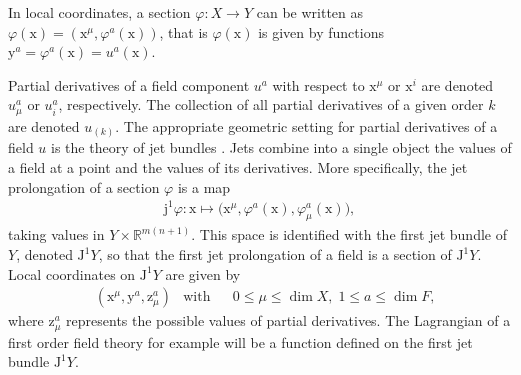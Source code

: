 \documentclass[12pt,a4paper,reqno]{article}
\begin{document}
In local coordinates, a section ${\ensuremath{\varphi}} : X \rightarrow Y$ can be written as ${\ensuremath{\varphi}} ({\ensuremath{{\ensuremath{\mathrm{{x}}}}}}) = ({\ensuremath{{\ensuremath{\mathrm{{x}}}}}}^{\mu}, {\ensuremath{\varphi}}^{a} ({\ensuremath{{\ensuremath{\mathrm{{x}}}}}}) )$, that is ${\ensuremath{\varphi}} ({\ensuremath{{\ensuremath{\mathrm{{x}}}}}})$ is given by functions ${\ensuremath{{\ensuremath{\mathrm{{y}}}}}}^{a} = {\ensuremath{\varphi}}^{a} ({\ensuremath{{\ensuremath{\mathrm{{x}}}}}}) = {\ensuremath{{\ensuremath{{u}}}}}^{a} ({\ensuremath{{\ensuremath{\mathrm{{x}}}}}})$.

Partial derivatives of a field component ${\ensuremath{{\ensuremath{{u}}}}}^{a}$ with respect to ${\ensuremath{{\ensuremath{\mathrm{{x}}}}}}^{\mu}$ or ${\ensuremath{{\ensuremath{\mathrm{{x}}}}}}^{i}$ are denoted ${\ensuremath{{\ensuremath{{u}}}}}^{a}_{\mu}$ or ${\ensuremath{{\ensuremath{{u}}}}}^{a}_{i}$, respectively.
The collection of all partial derivatives of a given order $k$ are denoted ${\ensuremath{{\ensuremath{{u}}}}}_{(k)}$.
The appropriate geometric setting for partial derivatives of a field ${\ensuremath{{\ensuremath{{u}}}}}$ is the theory of jet bundles \cite{Saunders:1989, Kolar:1993, Olver:1995, Ivancevic:2007}.
Jets combine into a single object the values of a field at a point and the values of its derivatives.
More specifically, the jet prolongation of a section ${\ensuremath{\varphi}}$ is a map
\begin{align*}
{\ensuremath{\mathrm{j}}}^{1} {\ensuremath{\varphi}} : {\ensuremath{{\ensuremath{\mathrm{{x}}}}}} \mapsto \big( {\ensuremath{{\ensuremath{\mathrm{{x}}}}}}^{\mu} , {\ensuremath{\varphi}}^{a} ({\ensuremath{{\ensuremath{\mathrm{{x}}}}}}) , {\ensuremath{\varphi}}^{a}_{\mu} ({\ensuremath{{\ensuremath{\mathrm{{x}}}}}}) \big) ,
\end{align*}
taking values in $Y \times \mathbb{R}^{m (n+1)}$. This space is identified with the first jet bundle of $Y$, denoted ${\ensuremath{\mathrm{J}}}^{1} Y$, so that the first jet prolongation of a field is a section of ${\ensuremath{\mathrm{J}}}^{1} Y$.
Local coordinates on ${\ensuremath{\mathrm{J}}}^{1} Y$ are given by
\begin{align*}
& ( {\ensuremath{{\ensuremath{\mathrm{{x}}}}}}^{\mu}, {\ensuremath{{\ensuremath{\mathrm{{y}}}}}}^{a}, {\ensuremath{{\ensuremath{\mathrm{{z}}}}}}^{a}_{\mu} )
& \text{with} &
& 0 \leq \mu \leq \dim X , \; 1 \leq a \leq \dim F ,
\end{align*}
where ${\ensuremath{{\ensuremath{\mathrm{{z}}}}}}^{a}_{\mu}$ represents the possible values of partial derivatives.
The Lagrangian of a first order field theory for example will be a function defined on the first jet bundle ${\ensuremath{\mathrm{J}}}^{1} Y$.
\end{document}
